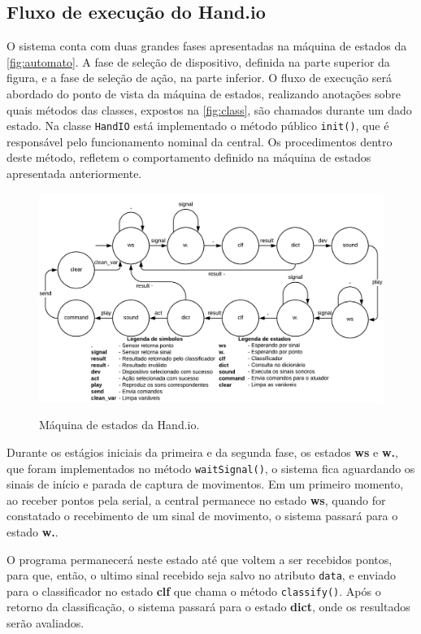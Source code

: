 \subsection{Fluxo de execução do Hand.io}

O sistema conta com duas grandes fases apresentadas na máquina de estados da \autoref{fig:automato}. A fase de seleção de dispositivo, definida na parte superior da figura, e a fase de seleção de ação, na parte inferior. O fluxo de execução será abordado do ponto de vista da máquina de estados, realizando anotações sobre quais métodos das classes, expostos na \autoref{fig:class}, são chamados durante um dado estado. 
% 
Na classe \texttt{HandIO} está implementado o método público \texttt{init()}, que é responsável pelo funcionamento nominal da central. Os procedimentos dentro deste método, refletem o comportamento definido na máquina de estados apresentada anteriormente.

\begin{figure}[ht]
    \centering
    \caption{Máquina de estados da Hand.io.}
    \includegraphics[width=\textwidth, keepaspectratio]{resources/maquina_estados.pdf}
    \label{fig:automato}
\end{figure}

Durante os estágios iniciais da primeira e da segunda fase, os estados \textbf{ws} e \textbf{w.}, que foram implementados no método \texttt{waitSignal()}, o sistema fica aguardando os sinais de início e parada de captura de movimentos. Em um primeiro momento, ao receber pontos pela serial, a central permanece no estado \textbf{ws}, quando for constatado o recebimento de um sinal de movimento, o sistema passará para o estado \textbf{w.}.

O programa permanecerá neste estado até que voltem a ser recebidos pontos, para que, então, o ultimo sinal recebido seja salvo no atributo \texttt{data}, e enviado para o classificador no estado \textbf{clf} que chama o método \texttt{classify()}. Após o retorno da classificação, o sistema passará para o estado \textbf{dict}, onde os resultados serão avaliados.

